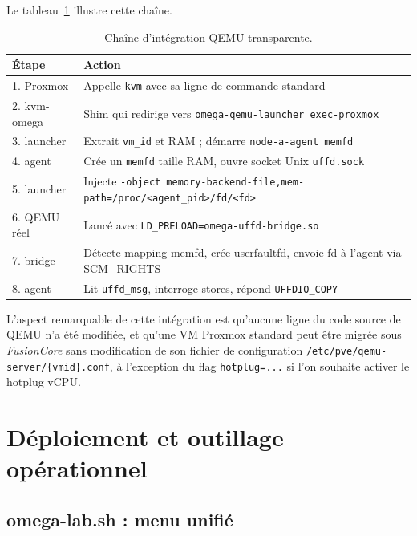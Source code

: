 Le tableau~\ref{tab:qemu-flow} illustre cette chaîne.

\begin{table}[H]
\centering
\small
\caption{Chaîne d'intégration QEMU transparente.}
\begin{tabular}{p{2.2cm}p{11cm}}
\toprule
\textbf{Étape} & \textbf{Action} \\
\midrule
1. Proxmox       & Appelle \texttt{kvm} avec sa ligne de commande standard \\
2. kvm-omega     & Shim qui redirige vers \texttt{omega-qemu-launcher exec-proxmox} \\
3. launcher      & Extrait \texttt{vm\_id} et RAM ; démarre \texttt{node-a-agent memfd} \\
4. agent         & Crée un \texttt{memfd} taille RAM, ouvre socket Unix \texttt{uffd.sock} \\
5. launcher      & Injecte \texttt{-object memory-backend-file,mem-path=/proc/<agent\_pid>/fd/<fd>} \\
6. QEMU réel     & Lancé avec \texttt{LD\_PRELOAD=omega-uffd-bridge.so} \\
7. bridge        & Détecte mapping memfd, crée userfaultfd, envoie fd à l'agent via SCM\_RIGHTS \\
8. agent         & Lit \texttt{uffd\_msg}, interroge stores, répond \texttt{UFFDIO\_COPY} \\
\bottomrule
\end{tabular}

\label{tab:qemu-flow}
\end{table}

L'aspect remarquable de cette intégration est qu'aucune ligne du code source de QEMU n'a été modifiée, et qu'une VM Proxmox standard peut être migrée sous \emph{FusionCore} sans modification de son fichier de configuration \texttt{/etc/pve/qemu-server/\{vmid\}.conf}, à l'exception du flag \texttt{hotplug=...} si l'on souhaite activer le hotplug vCPU.

\section{Déploiement et outillage opérationnel}
\label{sec:deploy}

\subsection{omega-lab.sh : menu unifié}

